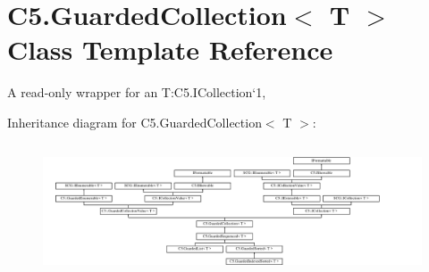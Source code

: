\hypertarget{class_c5_1_1_guarded_collection}{}\section{C5.\+Guarded\+Collection$<$ T $>$ Class Template Reference}
\label{class_c5_1_1_guarded_collection}


A read-\/only wrapper for an T\+:\+C5.\+I\+Collection`1,  


Inheritance diagram for C5.\+Guarded\+Collection$<$ T $>$\+:\begin{figure}[H]
\begin{center}
\leavevmode
\includegraphics[height=3.981043cm]{class_c5_1_1_guarded_collection}
\end{center}
\end{figure}
